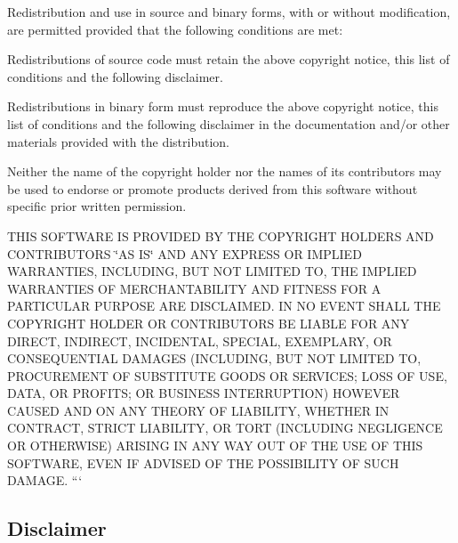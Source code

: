 Redistribution and use in source and binary forms, with or without modification, are permitted provided that the following conditions are met\+:


\begin{DoxyItemize}
\item Redistributions of source code must retain the above copyright notice, this list of conditions and the following disclaimer.
\item Redistributions in binary form must reproduce the above copyright notice, this list of conditions and the following disclaimer in the documentation and/or other materials provided with the distribution.
\item Neither the name of the copyright holder nor the names of its contributors may be used to endorse or promote products derived from this software without specific prior written permission.
\end{DoxyItemize}

T\+H\+IS S\+O\+F\+T\+W\+A\+RE IS P\+R\+O\+V\+I\+D\+ED BY T\+HE C\+O\+P\+Y\+R\+I\+G\+HT H\+O\+L\+D\+E\+RS A\+ND C\+O\+N\+T\+R\+I\+B\+U\+T\+O\+RS \char`\"{}\+A\+S I\+S\char`\"{} A\+ND A\+NY E\+X\+P\+R\+E\+SS OR I\+M\+P\+L\+I\+ED W\+A\+R\+R\+A\+N\+T\+I\+ES, I\+N\+C\+L\+U\+D\+I\+NG, B\+UT N\+OT L\+I\+M\+I\+T\+ED TO, T\+HE I\+M\+P\+L\+I\+ED W\+A\+R\+R\+A\+N\+T\+I\+ES OF M\+E\+R\+C\+H\+A\+N\+T\+A\+B\+I\+L\+I\+TY A\+ND F\+I\+T\+N\+E\+SS F\+OR A P\+A\+R\+T\+I\+C\+U\+L\+AR P\+U\+R\+P\+O\+SE A\+RE D\+I\+S\+C\+L\+A\+I\+M\+ED. IN NO E\+V\+E\+NT S\+H\+A\+LL T\+HE C\+O\+P\+Y\+R\+I\+G\+HT H\+O\+L\+D\+ER OR C\+O\+N\+T\+R\+I\+B\+U\+T\+O\+RS BE L\+I\+A\+B\+LE F\+OR A\+NY D\+I\+R\+E\+CT, I\+N\+D\+I\+R\+E\+CT, I\+N\+C\+I\+D\+E\+N\+T\+AL, S\+P\+E\+C\+I\+AL, E\+X\+E\+M\+P\+L\+A\+RY, OR C\+O\+N\+S\+E\+Q\+U\+E\+N\+T\+I\+AL D\+A\+M\+A\+G\+ES (I\+N\+C\+L\+U\+D\+I\+NG, B\+UT N\+OT L\+I\+M\+I\+T\+ED TO, P\+R\+O\+C\+U\+R\+E\+M\+E\+NT OF S\+U\+B\+S\+T\+I\+T\+U\+TE G\+O\+O\+DS OR S\+E\+R\+V\+I\+C\+ES; L\+O\+SS OF U\+SE, D\+A\+TA, OR P\+R\+O\+F\+I\+TS; OR B\+U\+S\+I\+N\+E\+SS I\+N\+T\+E\+R\+R\+U\+P\+T\+I\+ON) H\+O\+W\+E\+V\+ER C\+A\+U\+S\+ED A\+ND ON A\+NY T\+H\+E\+O\+RY OF L\+I\+A\+B\+I\+L\+I\+TY, W\+H\+E\+T\+H\+ER IN C\+O\+N\+T\+R\+A\+CT, S\+T\+R\+I\+CT L\+I\+A\+B\+I\+L\+I\+TY, OR T\+O\+RT (I\+N\+C\+L\+U\+D\+I\+NG N\+E\+G\+L\+I\+G\+E\+N\+CE OR O\+T\+H\+E\+R\+W\+I\+SE) A\+R\+I\+S\+I\+NG IN A\+NY W\+AY O\+UT OF T\+HE U\+SE OF T\+H\+IS S\+O\+F\+T\+W\+A\+RE, E\+V\+EN IF A\+D\+V\+I\+S\+ED OF T\+HE P\+O\+S\+S\+I\+B\+I\+L\+I\+TY OF S\+U\+CH D\+A\+M\+A\+GE. ``` \subsection*{Disclaimer}